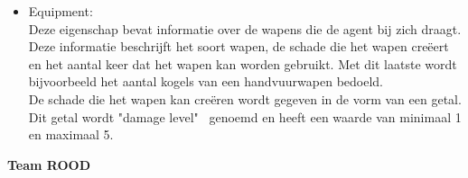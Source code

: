 \documentclass[12pt, letterpaper]{article}
\begin{document}
\begin{itemize}
    \item Equipment: \\
    Deze eigenschap bevat informatie over de wapens die de agent bij zich draagt. Deze informatie beschrijft het soort wapen, de schade die het wapen creëert en het aantal keer dat het wapen kan worden gebruikt. Met dit laatste wordt bijvoorbeeld het aantal kogels van een handvuurwapen bedoeld.
    \\De schade die het wapen kan creëren wordt gegeven in de vorm van een getal. Dit getal wordt "damage level" \ genoemd en heeft een waarde van minimaal 1 en maximaal 5.
\end{itemize}
\textbf{Team ROOD}
\end{document}
